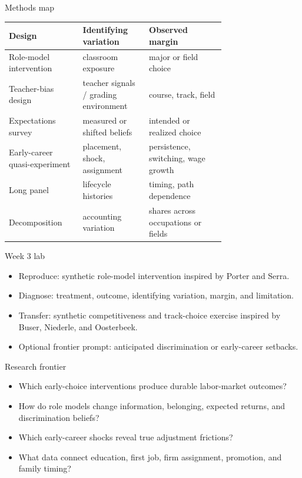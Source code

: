 \documentclass[aspectratio=169,11pt]{beamer}
\begin{document}
\begin{frame}{Methods map}
\scriptsize
\setlength{\tabcolsep}{3pt}
\begin{tabular}{p{0.22\linewidth} p{0.23\linewidth} p{0.28\linewidth}}
\toprule
Design & Identifying variation & Observed margin \\
\midrule
Role-model intervention & classroom exposure & major or field choice \\
Teacher-bias design & teacher signals / grading environment & course, track, field \\
Expectations survey & measured or shifted beliefs & intended or realized choice \\
Early-career quasi-experiment & placement, shock, assignment & persistence, switching, wage growth \\
Long panel & lifecycle histories & timing, path dependence \\
Decomposition & accounting variation & shares across occupations or fields \\
\bottomrule
\end{tabular}
\end{frame}

\begin{frame}{Week 3 lab}
\begin{itemize}
    \item Reproduce: synthetic role-model intervention inspired by Porter and Serra.
    \item Diagnose: treatment, outcome, identifying variation, margin, and limitation.
    \item Transfer: synthetic competitiveness and track-choice exercise inspired by Buser, Niederle, and Oosterbeek.
    \item Optional frontier prompt: anticipated discrimination or early-career setbacks.
\end{itemize}
\end{frame}

\begin{frame}{Research frontier}
\begin{itemize}
    \item Which early-choice interventions produce durable labor-market outcomes?
    \item How do role models change information, belonging, expected returns, and discrimination beliefs?
    \item Which early-career shocks reveal true adjustment frictions?
    \item What data connect education, first job, firm assignment, promotion, and family timing?
\end{itemize}
\end{frame}
\end{document}
